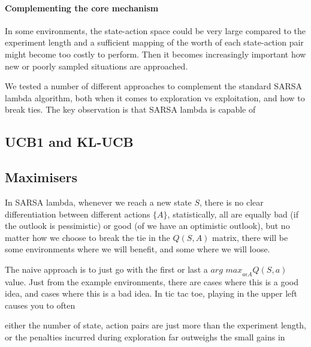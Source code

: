\paragraph{Complementing the core mechanism}
In some environments, the state-action space could be very large compared to the experiment length and a sufficient mapping of the worth of each state-action pair might become too costly to perform. Then it becomes increasingly important how new or poorly sampled situations are approached.

We tested a number of different approaches to complement the standard SARSA lambda algorithm, both when it comes to exploration vs exploitation, and how to break ties. The key observation is that SARSA lambda is capable of 

\subsection{UCB1 and KL-UCB}

\subsection{Maximisers}

In SARSA lambda, whenever we reach a new state $S$, there is no clear differentiation between different actions $\{A\}$, statistically, all are equally bad (if the outlook is pessimistic) or good (of we have an optimistic outlook), but no matter how we choose to break the tie in the $Q(S,A)$ matrix, there will be some environments where we will benefit, and some where we will loose.

The naive approach is to just go with the first or last a $\textit{arg max}_{a\epsilon A} Q(S,a)$ value. Just from the example environments, there are cases where this is a good idea, and cases where this is a bad idea. In tic tac toe, playing in the upper left causes you to often 





either the number of state, action pairs are just more than the experiment length, or the penalties incurred during exploration far outweighs the small gains in 